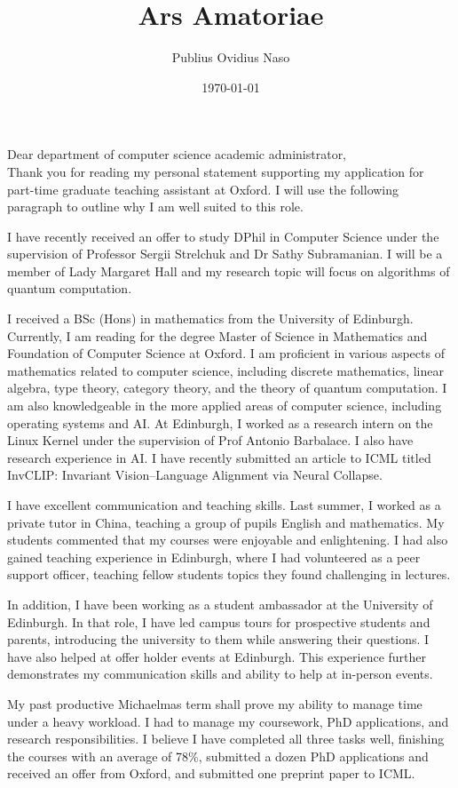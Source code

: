 \documentclass{article}
\title{Ars Amatoriae}
\author{Publius Ovidius Naso}
\date{\today}
\theoremstyle{definition}
\theoremstyle{definition}
\theoremstyle{remark}
\begin{document}
Dear department of computer science academic administrator,
\\

Thank you for reading my personal statement supporting my application for part-time graduate teaching assistant at Oxford. I will use the following paragraph to outline why I am well suited to this role. 

I have recently received an offer to study DPhil in Computer Science under the supervision of Professor Sergii Strelchuk and Dr Sathy Subramanian. I will be a member of Lady Margaret Hall and my research topic will focus on algorithms of quantum computation. 

I received a BSc (Hons) in mathematics from the University of Edinburgh. Currently, I am reading for the degree Master of Science in Mathematics and Foundation of Computer Science at Oxford. I am proficient in various aspects of mathematics related to computer science, including discrete mathematics, linear algebra, type theory, category theory, and the theory of quantum computation. I am also knowledgeable in the more applied areas of computer science, including operating systems and AI. At Edinburgh, I worked as a research intern on the Linux Kernel under the supervision of Prof Antonio Barbalace. I also have research experience in AI. I have recently submitted an article to ICML titled InvCLIP: Invariant Vision–Language Alignment via Neural Collapse. 

I have excellent communication and teaching skills. Last summer, I worked as a private tutor in China, teaching a group of pupils English and mathematics. My students commented that my courses were enjoyable and enlightening. I had also gained teaching experience in Edinburgh, where I had volunteered as a peer support officer, teaching fellow students topics they found challenging in lectures. 

In addition, I have been working as a student ambassador at the University of Edinburgh. In that role, I have led campus tours for prospective students and parents, introducing the university to them while answering their questions. I have also helped at offer holder events at Edinburgh. This experience further demonstrates my communication skills and ability to help at in-person events.

My past productive Michaelmas term shall prove my ability to manage time under a heavy workload. I had to manage my coursework, PhD applications, and research responsibilities. I believe I have completed all three tasks well, finishing the courses with an average of 78\%, submitted a dozen PhD applications and received an offer from Oxford, and submitted one preprint paper to ICML. 
\end{document}

